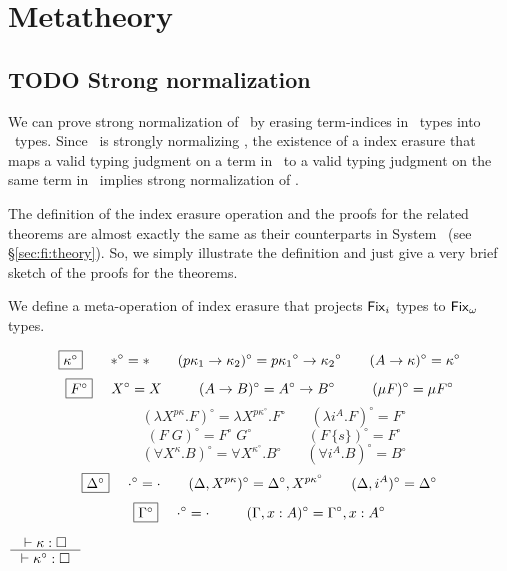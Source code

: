 \section{Metatheory} \label{sec:fixi:theory}

\subsection{TODO Strong normalization} \label{ssec:fixi:theory:sn}
We can prove strong normalization of \Fixi\ by erasing term-indices in \Fixi\ 
types into \Fixw\ types. Since \Fixw\ is strongly normalizing \cite{AbeMat04},
the existence of a index erasure that maps a valid typing judgment on a term
in \Fixi\ to a valid typing judgment on the same term in \Fixw\ implies
strong normalization of \Fixi.

The definition of the index erasure operation and the proofs for
the related theorems are almost exactly the same as their counterparts
in System \Fi\ (see \S\ref{sec:fi:theory}). So, we simply illustrate
the definition and just give a very brief sketch of the proofs for the
theorems.

We define a meta-operation of index erasure that projects $\Fixi$ types
to $\Fixw$ types.
\begin{definition}\label{def:Fixierase}
\[ \fbox{$\kappa^\circ$}
 ~~~~ ~~
 *^\circ =
 *
 ~~~~ ~~
 (p\kappa_1 -> \kappa_2)^\circ =
 p{\kappa_1}^\circ -> {\kappa_2}^\circ
 ~~~~ ~~
 (A -> \kappa)^\circ =
 \kappa^\circ
\]
\[ \fbox{$F^\circ$}
 ~~~~
 X^\circ =
 X
 ~~~~ ~~~~
 (A -> B)^\circ =
 A^\circ -> B^\circ
 ~~~~ ~~~~
 (\mu F)^\circ =
 \mu F^\circ
\]
\[ \qquad
 (\lambda X^{p\kappa}.F)^\circ =
 \lambda X^{p\kappa^\circ}.F^\circ
 ~~~~ ~~~~
 (\lambda i^A.F)^\circ =
 F^\circ
\]
\[ \qquad
 (F\;G)^\circ =
 F^\circ\;G^\circ
 ~~~~ ~~~~ ~~~~ ~~~~ ~~
 (F\,\{s\})^\circ =
 F^\circ
\]
\[ \qquad
 (\forall X^\kappa . B)^\circ =
 \forall X^{\kappa^\circ} . B^\circ
 ~~~~ ~~~~
 (\forall i^A . B)^\circ =
 B^\circ
\]
\[ \fbox{$\Delta^\circ$}
 ~~~~
 \cdot^\circ = \cdot
 ~~~~ ~~
 (\Delta,X^{p\kappa})^\circ = \Delta^\circ,X^{p\kappa^\circ}
 ~~~~ ~~
 (\Delta,i^A)^\circ = \Delta^\circ
\]
\[ \fbox{$\Gamma^\circ$}
 ~~~~
 \cdot^\circ = \cdot
 ~~~~ ~~~~
 (\Gamma,x:A)^\circ = \Gamma^\circ,x:A^\circ
\]
\end{definition}

\begin{theorem}
\label{thm:Fixierasesorting}
        $\inference{|- \kappa : \square}{|- \kappa^\circ : \square}$
\end{theorem}

